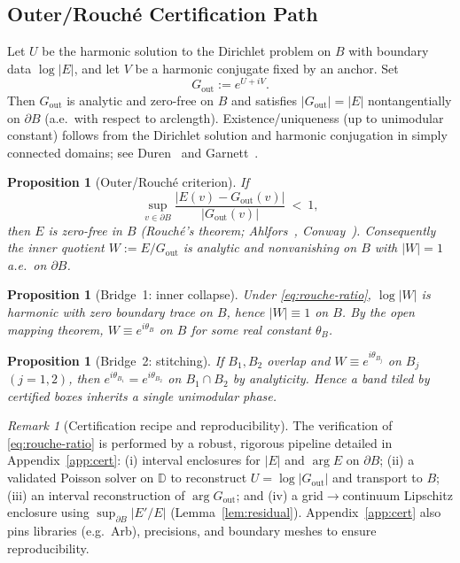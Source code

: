 \documentclass[11pt]{article}
\numberwithin{equation}{section}
\newtheorem{proposition}[theorem]{Proposition}
\theoremstyle{remark}
\newtheorem{remark}[theorem]{Remark}
\newcommand{\D}{\mathbb{D}}
\newcommand{\Gout}{G_{\mathrm{out}}}
\begin{document}
\subsection{Outer/Rouch\'e Certification Path}\label{subsec:rouche-criterion}

Let $U$ be the harmonic solution to the Dirichlet problem on $B$ with boundary data $\log|E|$, and let $V$ be a harmonic conjugate fixed by an anchor. Set
\[
\Gout:=e^{U+iV}.
\]
Then $\Gout$ is analytic and zero-free on $B$ and satisfies $|\Gout|=|E|$ nontangentially on $\partial B$ (a.e.\ with respect to arclength). Existence/uniqueness (up to unimodular constant) follows from the Dirichlet solution and harmonic conjugation in simply connected domains; see Duren~\cite[§II.5]{DurenHp} and Garnett~\cite[§II.2]{GarnettBAF}.

\begin{proposition}[Outer/Rouch\'e criterion]\label{prop:rouche-criterion}
If
\begin{equation}\label{eq:rouche-ratio}
\sup_{v\in\partial B}\frac{|E(v)-\Gout(v)|}{|\Gout(v)|}\ <\ 1,
\end{equation}
then $E$ is zero-free in $B$ (Rouch\'e's theorem; Ahlfors~\cite[§§5--6]{Ahlfors}, Conway~\cite[Ch.~VI]{Conway}). Consequently the inner quotient $W:=E/\Gout$ is analytic and nonvanishing on $B$ with $|W|=1$ a.e.\ on $\partial B$.
\end{proposition}

\begin{proposition}[Bridge~1: inner collapse]\label{prop:bridge1}
Under \eqref{eq:rouche-ratio}, $\log|W|$ is harmonic with zero boundary trace on $B$, hence $|W|\equiv 1$ on $B$. By the open mapping theorem, $W\equiv e^{i\theta_B}$ on $B$ for some real constant $\theta_B$.
\end{proposition}

\begin{proposition}[Bridge~2: stitching]\label{prop:bridge2}
If $B_1,B_2$ overlap and $W\equiv e^{i\theta_{B_j}}$ on $B_j$ $(j=1,2)$, then $e^{i\theta_{B_1}}=e^{i\theta_{B_2}}$ on $B_1\cap B_2$ by analyticity. Hence a band tiled by certified boxes inherits a single unimodular phase.
\end{proposition}

\begin{remark}[Certification recipe and reproducibility]
The verification of \eqref{eq:rouche-ratio} is performed by a robust, rigorous pipeline detailed in Appendix~\ref{app:cert}: %
(i) interval enclosures for $|E|$ and $\arg E$ on $\partial B$; (ii) a validated Poisson solver on $\D$ to reconstruct $U=\log|\Gout|$ and transport to $B$; (iii) an interval reconstruction of $\arg\Gout$; and (iv) a grid$\to$continuum Lipschitz enclosure using $\sup_{\partial B}|E'/E|$ (Lemma~\ref{lem:residual}). Appendix~\ref{app:cert} also pins libraries (e.g.\ Arb), precisions, and boundary meshes to ensure reproducibility. %
\end{remark}
\end{document}
